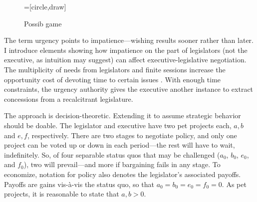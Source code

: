 \documentclass[letter,12pt]{article}
\begin{document}
\begin{figure}
  \centering
    =[circle,draw]
  \caption{Possib game}\label{f:skip}
\end{figure}


The term urgency points to impatience---wishing results sooner rather than later. I introduce elements showing how impatience on the part of legislators (not the executive, as intuition may suggest) can affect executive-legislative negotiation. The multiplicity of needs from legislators and finite sessions increase the opportunity cost of devoting time to certain issues \citep{fenno.1973}. With enough time constraints, the urgency authority gives the executive another instance to extract concessions from a recalcitrant legislature. 

The approach is decision-theoretic. Extending it to assume strategic behavior should be doable. The legislator and executive have two pet projects each, $a,b$ and $e,f$, respectively. There are two stages to negotiate policy, and only one project can be voted up or down in each period---the rest will have to wait, indefinitely. So, of four separable status quos that may be challenged ($a_0$, $b_0$, $e_0$, and $f_0$), two will prevail---and more if bargaining fails in any stage. To economize, notation for policy also denotes the legislator's associated payoffs. Payoffs are gains vis-\`a-vis the status quo, so that $a_0=b_0=e_0=f_0=0$. As pet projects, it is reasonable to state that $a,b>0$. 
\end{document}
